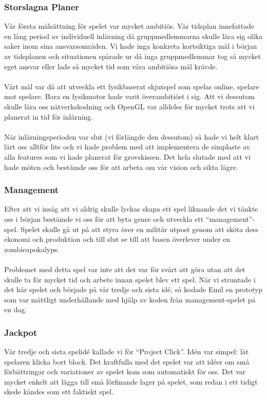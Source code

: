 \documentclass[a4paper]{article}
\begin{document}
\subsubsection{Storslagna Planer}
Vår första målsättning för spelet var mycket ambitiös. Vår tidsplan innefattade en lång period av individuell inlärning då gruppmedlemmarna skulle lära sig olika saker inom sina ansvarsområden. Vi hade inga konkreta kortsiktiga mål i början av tidsplanen och situationen spårade ur då inga gruppmedlemmar tog så mycket eget ansvar eller lade så mycket tid som våra ambitiösa mål krävde.
\\
\\
Vårt mål var då att utveckla ett fysikbaserat skjutspel som spelas online, spelare mot spelare. Bara en fysikmotor hade varit överambitiöst i sig. Att vi dessutom skulle lära oss nätverkskodning och OpenGL var alldeles för mycket trots att vi planerat in tid för inlärning.
\\
\\
När inlärningsperioden var slut (vi förlängde den dessutom) så hade vi helt klart lärt oss alltför lite och vi hade problem med att implementera de simplaste av alla features som vi hade planerat för grovskissen. Det hela slutade med att vi hade möten och bestämde oss för att arbeta om vår vision och sikta lägre.

\subsubsection{Management}
Efter att vi insåg att vi aldrig skulle lyckas skapa ett spel liknande det vi tänkte oss i början bestämde vi oss för att byta genre och utveckla ett “management”-spel. Spelet skulle gå ut på att styra över en militär utpost genom att sköta dess ekonomi och produktion och till slut se till att basen överlever under en zombieapokalyps.
\\
\\
Problemet med detta spel var inte att det var för svårt att göra utan att det skulle ta för mycket tid och arbete innan spelet blev ett spel. När vi struntade i det här spelet och började på vår tredje och sista idé, så kodade Emil en prototyp som var måttligt underhållande med hjälp av koden från management-spelet på en dag.

\subsubsection{Jackpot}
Vår tredje och sista spelidé kallade vi för “Project Click”. Idén var simpel: låt spelaren klicka bort block. Det kraftfulla med det spelet var att idéer om små förbättringar och variationer av spelet kom som automatiskt för oss. Det var mycket enkelt att lägga till små förfinande lager på spelet, som redan i ett tidigt skede kändes som ett faktiskt spel.
\newpage
\end{document}
